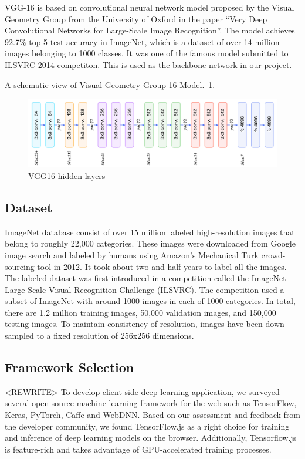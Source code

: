 VGG-16 is based on convolutional neural network model proposed by the Visual Geometry Group from the University of Oxford in the paper “Very Deep Convolutional Networks for Large-Scale Image Recognition”.  The model achieves 92.7\% top-5 test accuracy in ImageNet, which is a dataset of over 14 million images belonging to 1000 classes. It was one of the famous model submitted to ILSVRC-2014 competiton. This is used as the backbone network in our project.

A schematic view of Visual Geometry Group 16 Model.~\ref{fig:CNN-1}.
\begin{figure}[htbp]
\centering
\includegraphics[width=1\textwidth]{images/cnn-vgg16-1.png}
\caption{VGG16 hidden layers}
\label{fig:CNN-1}
\end{figure}

\subsection{Dataset}

ImageNet database consist of over 15 million labeled high-resolution images that belong to roughly 22,000 categories. These images were downloaded from Google image search and labeled by humans using Amazon's Mechanical Turk crowd-sourcing tool in 2012. It took about two and half years to label all the images. The labeled dataset was first introduced in a competition called the ImageNet Large-Scale Visual Recognition Challenge (ILSVRC). The competition used a subset of ImageNet with around 1000 images in each of 1000 categories. In total, there are 1.2 million training images, 50,000 validation images, and 150,000 testing images. To maintain consistency of resolution, images have been down-sampled to a fixed resolution of 256x256 dimensions.
    
\subsection{Framework Selection}

<REWRITE> To develop client-side deep learning application, we surveyed several open source machine learning framework for the web such as TensorFlow, Keras, PyTorch, Caffe and WebDNN. Based on our assessment and feedback from the developer community, we found TensorFlow.js as a right choice for training and inference of deep learning models on the browser. Additionally, Tensorflow.js is feature-rich and takes advantage of GPU-accelerated training processes. 

